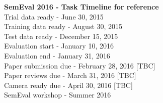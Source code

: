 \documentclass{article}
\begin{document}
\textbf{SemEval 2016 - Task Timeline for reference} \\
Trial data ready - June 30, 2015 \\
Training data ready - August 30, 2015 \\
Test data ready - December 15, 2015 \\
Evaluation start - January 10, 2016 \\
Evaluation end - January 31, 2016 \\
Paper submission due - February 28, 2016 [TBC] \\
Paper reviews due - March 31, 2016 [TBC] \\
Camera ready due - April 30, 2016 [TBC] \\
SemEval workshop - Summer 2016



\end{document}
